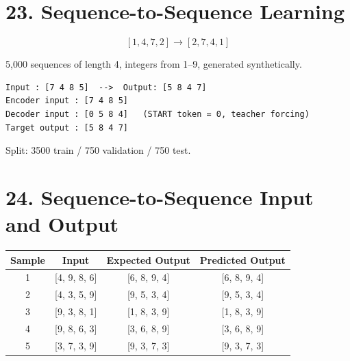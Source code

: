 \documentclass[10pt]{article}
\begin{document}
\section*{23. Sequence-to-Sequence Learning}

\[
[1,4,7,2]\rightarrow[2,7,4,1]
\]

5,000 sequences of length 4, integers from 1--9, generated synthetically.

\begin{center}
\end{center}

\begin{verbatim}
Input : [7 4 8 5]  -->  Output: [5 8 4 7]
Encoder input : [7 4 8 5]
Decoder input : [0 5 8 4]   (START token = 0, teacher forcing)
Target output : [5 8 4 7]
\end{verbatim}

Split: 3500 train / 750 validation / 750 test.

\section*{24. Sequence-to-Sequence Input and Output}

\begin{center}
\begin{tabular}{|c|c|c|c|}
\hline
Sample & Input & Expected Output & Predicted Output\\
\hline
1 & [4, 9, 8, 6] & [6, 8, 9, 4] & [6, 8, 9, 4]\\
2 & [4, 3, 5, 9] & [9, 5, 3, 4] & [9, 5, 3, 4]\\
3 & [9, 3, 8, 1] & [1, 8, 3, 9] & [1, 8, 3, 9]\\
4 & [9, 8, 6, 3] & [3, 6, 8, 9] & [3, 6, 8, 9]\\
5 & [3, 7, 3, 9] & [9, 3, 7, 3] & [9, 3, 7, 3]\\
\hline
\end{tabular}
\end{center}
\end{document}
